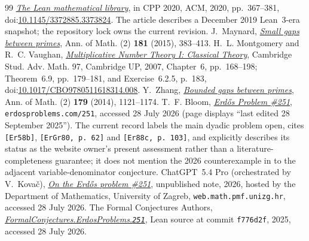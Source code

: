 \documentclass[11pt]{article}
\begin{document}
\begin{thebibliography}{99}
  \href{https://doi.org/10.1145/3372885.3373824}
  {\emph{The Lean mathematical library}},
  in CPP 2020, ACM, 2020, pp.~367--381,
  doi:\href{https://doi.org/10.1145/3372885.3373824}
  {10.1145/3372885.3373824}.  The article describes a December 2019
  Lean~3-era snapshot; the repository lock owns the current revision.
 J.~Maynard,
  \href{https://doi.org/10.4007/annals.2015.181.1.7}
  {\emph{Small gaps between primes}},
  Ann. of Math. (2) \textbf{181} (2015), 383--413.
 H.~L. Montgomery and R.~C. Vaughan,
  \href{https://doi.org/10.1017/CBO9780511618314.008}
  {\emph{Multiplicative Number Theory I: Classical Theory}},
  Cambridge Stud. Adv. Math. 97, Cambridge UP, 2007,
  Chapter~6, pp.~168--198; Theorem~6.9, pp.~179--181, and
  Exercise~6.2.5, p.~183,
  doi:\href{https://doi.org/10.1017/CBO9780511618314.008}
  {10.1017/CBO9780511618314.008}.
 Y.~Zhang,
  \href{https://doi.org/10.4007/annals.2014.179.3.7}
  {\emph{Bounded gaps between primes}},
  Ann. of Math. (2) \textbf{179} (2014), 1121--1174.
 T.~F. Bloom,
  \href{https://www.erdosproblems.com/251}{\emph{Erd\H{o}s Problem \#251}},
  \texttt{erdosproblems.com/251}, accessed 28 July 2026 (page displays
  ``last edited 28 September 2025'').  The current record labels the main
  dyadic problem open, cites \texttt{[Er58b]}, \texttt{[ErGr80, p.~62]} and
  \texttt{[Er88c, p.~103]}, and explicitly describes its status as the
  website owner's present assessment rather than a literature-completeness
  guarantee; it does not mention the 2026 counterexample in
  \cite{kovac2026} to the adjacent variable-denominator conjecture.
 ChatGPT~5.4 Pro (orchestrated by V.~Kova\v{c}),
  \href{https://web.math.pmf.unizg.hr/~vjekovac/files/Erdos_problem_251.pdf}
  {\emph{On the Erd\H{o}s problem \#251}},
  unpublished note, 2026, hosted by the Department of Mathematics, University
  of Zagreb, \texttt{web.math.pmf.unizg.hr}, accessed 28 July 2026.
 The Formal Conjectures Authors,
  \href{https://github.com/google-deepmind/formal-conjectures/blob/f776d2f2039351b00737ffcafb9d7d7666e1d9af/FormalConjectures/ErdosProblems/251.lean}
  {\emph{FormalConjectures.ErdosProblems.\texttt{251}}},
  Lean source at commit \texttt{f776d2f}, 2025, accessed 28 July 2026.
\end{thebibliography}
\end{document}
